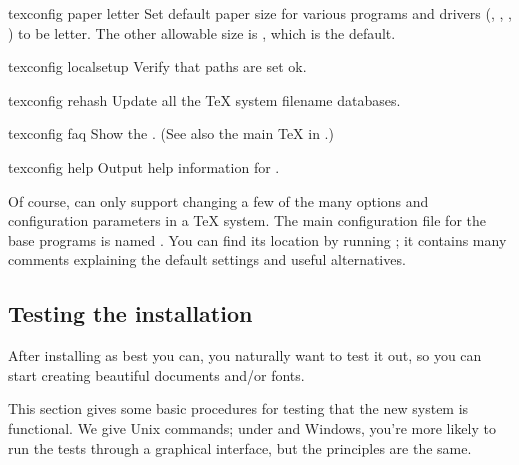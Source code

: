\documentclass{article}
\begin{document}
\begin{ttdescription}

\item [texconfig paper letter] Set default paper size for
various programs and drivers (, ,
, ) to be  letter.  The other
allowable size is , which is the default.

\item [texconfig localsetup] Verify that paths are set ok.

\item [texconfig rehash] Update all the \TeX{} system filename databases.

\item [texconfig faq] Show the \teTeX{} .
(See also the main \TeX{}  in .)

\item [texconfig help] Output help information for .

\end{ttdescription}

Of course,  can only support changing a few of the
many options and configuration parameters in a \TeX{} system.  The main
configuration file for the base \Webc{} programs is named
.  You can find its location by running
; it contains many comments explaining the
default settings and useful alternatives.


\subsection{Testing the installation}
\label{sec:test-install}

After installing \TL{} as best you can, you naturally want to test
it out, so you can start creating beautiful documents and\slash or fonts.

This section gives some basic procedures for testing that the new system
is functional.  We give Unix commands; under \MacOSX{} and Windows,
you're more likely to run the tests through a graphical interface, but
the principles are the same.
\end{document}
